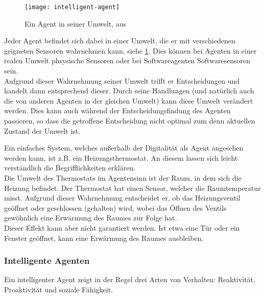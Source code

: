 \begin{figure}[hptb]
 \centering
 \texttt{[image: intelligent-agent]}
 \caption[Ein Agent in seiner Umwelt]
 		{Ein Agent in seiner Umwelt, aus \cite{multiagent}}
 \label{figure:intelligent-agent}
\end{figure}
\noindent
Jeder Agent befindet sich dabei in einer Umwelt, die er mit verschiedenen geigneten Sensoren wahrnehmen kann, siehe \cref{figure:intelligent-agent}.
Dies können bei Agenten in einer realen Umwelt phsysische Sensoren oder bei Softwareagenten Softwaresensoren sein.
\\
Aufgrund dieser Wahrnehmung seiner Umwelt trifft er Entscheidungen und handelt dann entsprechend dieser.
Durch seine Handlungen (und natürlich auch die von anderen Agenten in der gleichen Umwelt) kann diese Umwelt verändert werden.
Dies kann auch während der Entscheidungsfindung des Agenten passieren, so dass die getroffene Entscheidung nicht optimal zum denn aktuellen Zustand der Umwelt ist.

Ein einfaches System, welches außerhalb der Digitalität als Agent angesehen werden kann, ist z.B. ein Heizungsthermostat.
An diesem lassen sich leicht verständlich die Begrifflichkeiten erklären.
\\
Die Umwelt des Thermostats im Agentensinn ist der Raum, in dem sich die Heizung befindet.
Der Thermostat hat einen Sensor, welcher die Raumtemperatur misst.
Aufgrund dieser Wahrnehmung entscheidet er, ob das Heizungsventil geöffnet oder geschlossen (gehalten) wird, wobei das Öffnen des Ventils gewöhnlich eine Erwärmung des Raumes zur Folge hat.
\\
Dieser Effekt kann aber nicht garantiert werden.
Ist etwa eine Tür oder ein Fenster geöffnet, kann eine Erwärmung des Raumes ausbleiben.



\subsubsection{Intelligente Agenten}

Ein intelligenter Agent zeigt in der Regel drei Arten von Verhalten: Reaktivität, Proaktivität und soziale Fähigkeit.

